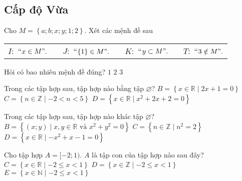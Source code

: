 \subsection*{Cấp độ Vừa}
\begin{ex}%
	Cho $M = \left\{a;b;x;y;1;2 \right\}$. Xét các mệnh đề sau
	\begin{center}
		\begin{tabular}{llll}
			$I:$ ``$ x \in M".\quad $ &$J:$ ``$\left\{1\right\} \in M".\quad $ &$K:$ ``$ y \subset M". \quad $ & $T:$ ``$3 \notin M". $  \\ 
		\end{tabular}
	\end{center}
	Hỏi có bao nhiêu mệnh đề đúng?
	{$1 $}
	{\True $ 2$}
	{$ 3$}
\end{ex}

\begin{ex}%
	Trong các tập hợp sau, tập hợp nào bằng tập $\varnothing$?
	{$ B = \left\{x \in \mathbb{R} \mid 2x+1= 0\right\}$}
	{$C= \left\{n \in \mathbb{Z} \mid -2< n < 5 \right\} $}
	{\True $ D = \left\{x \in \mathbb{R} \mid x^2+2x+2= 0\right\}$}
\end{ex}
\begin{ex}%
	Trong các tập hợp sau, tập hợp nào khác tập $\varnothing$?
	{ \True $ B = \left\{(x;y) \mid  x,y \in \mathbb{R} \text{ và } x^2+y^2= 0\right\}$}
	{$C= \left\{n \in \mathbb{Z} \mid n^2 = 2 \right\} $}
	{$ D = \left\{x \in \mathbb{R} \mid -x^2+x-1= 0\right\}$}
\end{ex}

\begin{ex}%
	Cho tập hợp $A = [-2;1)$. $A$ là tập con của tập hợp nào sau đây?
	\choice{$B=[-1;2)$}
	{\True $C = \left\{x \in \mathbb{R} \mid -2 \le x < 1\right\} $}
	{$D=  \left\{x \in \mathbb{Z} \mid -2 \le x < 1\right\}$}
	{$E=  \left\{x \in \mathbb{N} \mid -2 \le x < 1\right\}$}
	\loigiai{
		$C = \left\{x \in \mathbb{R} \mid -2 \le x < 1\right\} =[-2;1)$, suy ra $A\subset C$.
	}
\end{ex}

